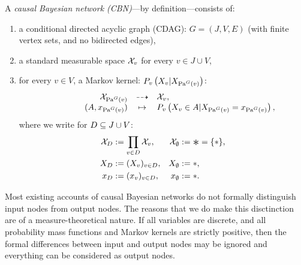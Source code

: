 \begin{Def}
    \label{def-CBN}
    A \emph{causal Bayesian network (CBN)}---by definition---consists of:
    \begin{enumerate}[label=\alph*)]
        \item a conditional directed acyclic graph (CDAG): $G = (J,V,E)$ (with finite vertex sets, and no bidirected edges),
        \item a standard measurable space $\mathcal{X}_v$ for every $v \in J \cup V$,
        \item for every $v \in V$, a Markov kernel: 
            $\displaystyle  P_v\left ( X_v| X_{\mathrm{Pa}^G(v)}\right )$:
        \[\begin{array}{ccrcl}
           & & \mathcal{X}_{\mathrm{Pa}^G(v)} & \dashrightarrow & \mathcal{X}_v, \\
           && \qquad (A,x_{\mathrm{Pa}^G(v)}) & \mapsto &  P_v\left ( X_v \in A|X_{\mathrm{Pa}^G(v)} = x_{\mathrm{Pa}^G(v)}\right ),
        \end{array}\]
        where we write for $D \subseteq J \cup V$:
               \begin{align*} 
                   \Xcal_D &:= \prod_{v \in D} \Xcal_v,&
                   \Xcal_\emptyset &:= \Asterisk = \{\ast\},\\
                   X_D &:= (X_v)_{v \in D},&
                   X_\emptyset &:= \ast,\\
                   x_D &:= (x_v)_{v \in D},&
                   x_\emptyset &:= \ast.
              \end{align*}
    \end{enumerate}
\end{Def}
\begin{Rem}
  Most existing accounts of causal Bayesian networks do not formally distinguish input nodes from output nodes.
  The reasons that we do make this disctinction are of a measure-theoretical nature.
  If all variables are discrete, and all probability mass functions and Markov kernels are strictly positive, then the formal differences between input and output nodes may be ignored and everything can be considered as output nodes.
\end{Rem}

